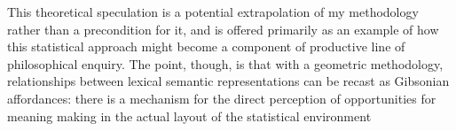 This theoretical speculation is a potential extrapolation of my methodology rather than a precondition for it, and is offered primarily as an example of how this statistical approach might become a component of productive line of philosophical enquiry.  The point, though, is that with a geometric methodology, relationships between lexical semantic representations can be recast as Gibsonian affordances: there is a mechanism for the direct perception of opportunities for meaning making in the actual layout of the statistical environment
